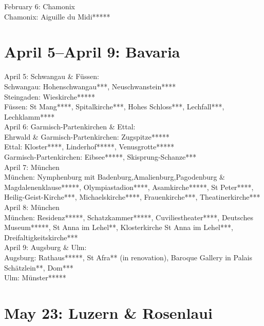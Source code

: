 February 6: Chamonix\\
Chamonix: Aiguille du Midi*****

\section{April 5--April 9: Bavaria}
\label{2010:Bavaria}

April 5: Schwangau \& F\"ussen:\\
Schwangau: Hohenschwangau***, Neuschwanstein****\\
Steingaden: Wieskirche*****\\
F\"ussen: St Mang****, Spitalkirche***, Hohes Schloss***, Lechfall***, Lechklamm****\\

April 6: Garmisch-Partenkirchen \& Ettal:\\
Ehrwald \& Garmisch-Partenkirchen: Zugspitze*****\\
Ettal: Kloster****, Linderhof*****, Venusgrotte*****\\
Garmisch-Partenkirchen: Eibsee*****, Skisprung-Schanze***\\

April 7: M\"unchen\\
M\"unchen: Nymphenburg mit Badenburg,Amalienburg,Pagodenburg \& Magdalenenklause*****, Olympiastadion****, Asamkirche*****, St Peter****, Heilig-Geist-Kirche***, Michaelskirche****, Frauenkirche***, Theatinerkirche***\\

April 8: M\"unchen\\
M\"unchen: Residenz*****, Schatzkammer*****, Cuviliestheater****, Deutsches Museum*****, St Anna im Lehel**, Klosterkirche St Anna im Lehel***, Dreifaltigkeitskirche***\\

April 9: Augsburg \& Ulm:\\
Augsburg: Rathaus*****, St Afra** (in renovation), Baroque Gallery in Palais Sch\"atzlein**, Dom***\\
Ulm: M\"unster*****

\section{May 23: Luzern \& Rosenlaui}
\label{2010:Luzern}

